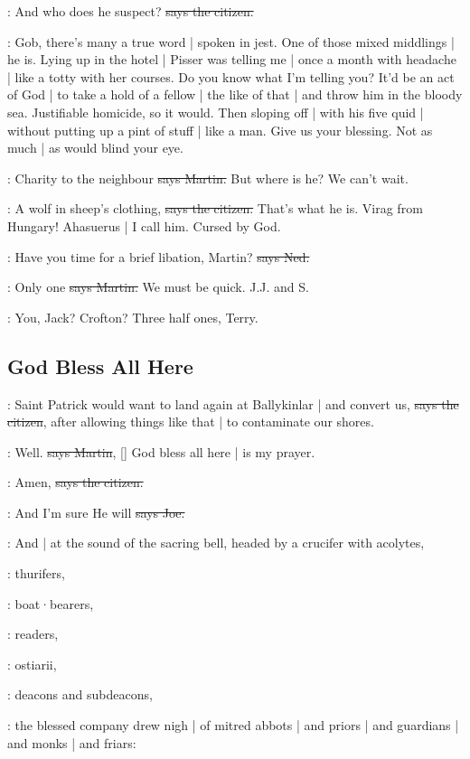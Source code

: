 \citizen:
And who does he suspect?
\sout{says the citizen.}

\Nq:
Gob,
there's many a true word |
spoken in jest.
One of those mixed middlings |
he is.
Lying up in the hotel |
Pisser was telling me |
once a month with headache |
like a totty with her courses.
Do you know what I'm telling you?
It'd be an act of God |
to take a hold of a fellow |
the like of that |
and throw him in the bloody sea.
Justifiable homicide,
so it would.
Then sloping off |
with his five quid |
without putting up a pint of stuff |
like a man.
Give us your blessing.
Not as much |
as would blind your eye.

\cunningham:
Charity to the neighbour
\sout{says Martin.}
But where is he?
We can't wait.

\citizen:
A wolf in sheep's clothing,
\sout{says the citizen.}
That's what he is.
Virag from Hungary!
Ahasuerus |
I call him.
Cursed by God.

\lambert:
Have you time for a brief libation,
Martin?
\sout{says Ned.}

\cunningham:
Only one
\sout{says Martin.}
We must be quick.
J.J. and S.

\lambert:
You,
Jack?
Crofton?
Three half ones,
Terry.


\subsection*{God Bless All Here}

\citizen:
Saint Patrick would want to land again at Ballykinlar |
and convert us,
\sout{says the citizen},
after allowing things like that |
to contaminate our shores.

\cunningham:
Well.
\sout{says Martin},
[]
God bless all here |
is my prayer.

\citizen:
Amen,
\sout{says the citizen.}

\joe:
And I'm sure He will
\sout{says Joe.}

:
And |
at the sound of the sacring bell,
headed by a crucifer with acolytes,

:
thurifers,

:
boat·bearers,

:
readers,

:
ostiarii,

:
deacons and subdeacons,

:
the blessed company drew nigh |
of mitred abbots |
and priors |
and guardians |
and monks |
and friars:

